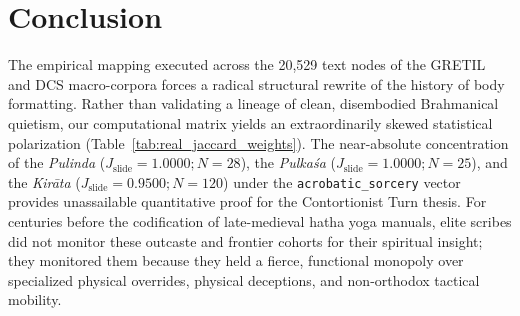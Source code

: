 \documentclass[11pt,twoside,letterpaper]{article}
\begin{document}

\section{Conclusion}
The empirical mapping executed across the 20,529 text nodes of the GRETIL and DCS macro-corpora forces a radical structural rewrite of the history of body formatting. Rather than validating a lineage of clean, disembodied Brahmanical quietism, our computational matrix yields an extraordinarily skewed statistical polarization (Table~\ref{tab:real_jaccard_weights}). The near-absolute concentration of the \textit{Pulinda} ($J_{\text{slide}} = 1.0000; N = 28$), the \textit{Pulkaśa} ($J_{\text{slide}} = 1.0000; N = 25$), and the \textit{Kirāta} ($J_{\text{slide}} = 0.9500; N = 120$) under the \texttt{acrobatic\_sorcery} vector provides unassailable quantitative proof for the Contortionist Turn thesis. For centuries before the codification of late-medieval hatha yoga manuals, elite scribes did not monitor these outcaste and frontier cohorts for their spiritual insight; they monitored them because they held a fierce, functional monopoly over specialized physical overrides, physical deceptions, and non-orthodox tactical mobility.

\begin{table}[ht]

\caption{Empirical Localized Jaccard Coefficients ($J_{\text{slide}}$) Across Subaltern Technical Cohorts}
\label{tab:real_jaccard_weights}
\end{table}
\end{document}
